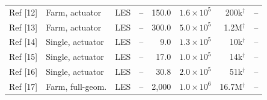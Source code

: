 \begin{longtable}{@{}llccrrrr@{}}
Ref [12] & Farm, actuator & LES & -- & 150.0 & $1.6\!\times\!10^{5}$ & 200k$^{\dagger}$ & -- \\
Ref [13] & Farm, actuator & LES & -- & 300.0 & $5.0\!\times\!10^{5}$ & 1.2M$^{\dagger}$ & -- \\
Ref [14] & Single, actuator & LES & -- & 9.0 & $1.3\!\times\!10^{5}$ & 10k$^{\dagger}$ & -- \\
Ref [15] & Single, actuator & LES & -- & 17.0 & $1.0\!\times\!10^{5}$ & 14k$^{\dagger}$ & -- \\
Ref [16] & Single, actuator & LES & -- & 30.8 & $2.0\!\times\!10^{5}$ & 51k$^{\dagger}$ & -- \\
Ref [17] & Farm, full-geom. & LES & -- & 2,000 & $1.0\!\times\!10^{6}$ & 16.7M$^{\dagger}$ & -- \\
\end{longtable}
\endgroup
